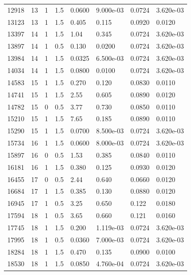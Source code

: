 \documentclass[preview]{standalone}
\begin{document}
{{{\begin{tabular}{L{1.2cm}C{1.2cm} C{0.3cm}C{0.5cm} C{1.4cm}C{1.4cm} C{1.4cm}C{1.4cm}}
  12918  &    13  & 1     & 1.5 &  0.0600  & 9.000e-03  & 0.0724 &  3.620e-03   \\ 
  13123  &    13  & 1     & 1.5 &  0.405  & 0.115  & 0.0920 &  0.0120   \\ 
  13397  &    14  & 1     & 1.5 &  1.04  & 0.345  & 0.0724 &  3.620e-03   \\ 
  13897  &    14  & 1     & 0.5 &  0.130  & 0.0200  & 0.0724 &  3.620e-03   \\ 
  13984  &    14  & 1     & 1.5 &  0.0325  & 6.500e-03  & 0.0724 &  3.620e-03   \\ 
  14034  &    14  & 1     & 1.5 &  0.0800  & 0.0100  & 0.0724 &  3.620e-03   \\ 
  14583  &    15  & 1     & 1.5 &  0.270  & 0.120  & 0.0830 &  0.0110   \\ 
  14741  &    15  & 1     & 1.5 &  2.55  & 0.605  & 0.0890 &  0.0120   \\ 
  14782  &    15  & 0     & 0.5 &  3.77  & 0.730  & 0.0850 &  0.0110   \\ 
  15210  &    15  & 1     & 1.5 &  7.65  & 0.185  & 0.0890 &  0.0110   \\ 
  15290  &    15  & 1     & 1.5 &  0.0700  & 8.500e-03  & 0.0724 &  3.620e-03   \\ 
  15734  &    16  & 1     & 1.5 &  0.0600  & 8.000e-03  & 0.0724 &  3.620e-03   \\ 
  15897  &    16  & 0     & 0.5 &  1.53  & 0.385  & 0.0840 &  0.0110   \\ 
  16181  &    16  & 1     & 1.5 &  0.380  & 0.125  & 0.0930 &  0.0120   \\ 
  16455  &    17  & 0     & 0.5 &  2.44  & 0.640  & 0.0660 &  0.0120   \\ 
  16684  &    17  & 1     & 1.5 &  0.385  & 0.130  & 0.0880 &  0.0120   \\ 
  16945  &    17  & 1     & 0.5 &  3.25  & 0.650  & 0.122 &  0.0180   \\ 
  17594  &    18  & 1     & 0.5 &  3.65  & 0.660  & 0.121 &  0.0160   \\ 
  17745  &    18  & 1     & 1.5 &  0.200  & 1.119e-03  & 0.0724 &  3.620e-03   \\ 
  17995  &    18  & 1     & 0.5 &  0.0360  & 7.000e-03  & 0.0724 &  3.620e-03   \\ 
  18284  &    18  & 1     & 1.5 &  0.470  & 0.135  & 0.0900 &  0.0100   \\ 
  18530  &    18  & 1     & 1.5 &  0.0850  & 4.760e-04  & 0.0724 &  3.620e-03   \\ 

\end{tabular}}}}
\end{document}
